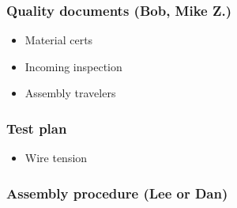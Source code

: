 \subsubsection{Quality documents (Bob, Mike Z.)}

\begin{itemize}
\item{Material certs}
\item{Incoming inspection}
\item{Assembly travelers}
\end{itemize}

\subsubsection{Test plan}

\begin{itemize}
\item{Wire tension}
\end{itemize}

\subsubsection{Assembly procedure (Lee or Dan)}

